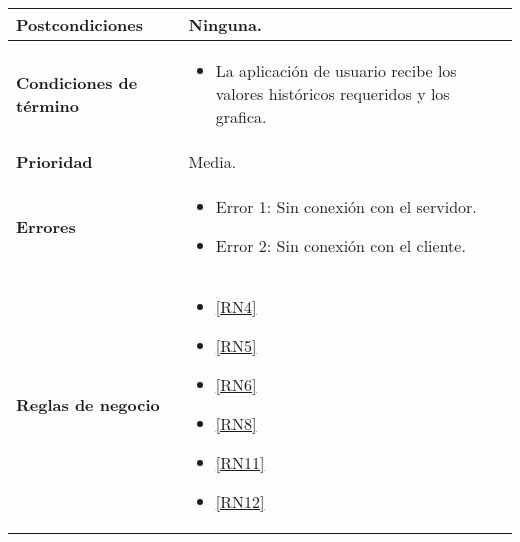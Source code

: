 \begin{longtable}{|J{5cm}|J{10.3cm}|}
	\textbf{Postcondiciones} &
		Ninguna.\\ \hline
	\textbf{Condiciones de término} & 
		\begin{itemize}
			\item La aplicación de usuario recibe los valores históricos requeridos y los grafica.
		\end{itemize} \\ \hline 
	\textbf{Prioridad} & 
		Media. \\ \hline
	\textbf{Errores} & 
		\begin{itemize}
		    \item \label{CUU1.3:Error1} Error 1: Sin conexión con el servidor.
		    \item \label{CUU1.3:Error2} Error 2: Sin conexión con el cliente.
		\end{itemize} \\ \hline
	\textbf{Reglas de negocio} & 
		\begin{itemize}
		    \item \ref{RN4}
		    \item \ref{RN5}
		    \item \ref{RN6}
		    \item \ref{RN8}
			\item \ref{RN11}
			\item \ref{RN12}
		\end{itemize} \\ \hline
\end{longtable}

